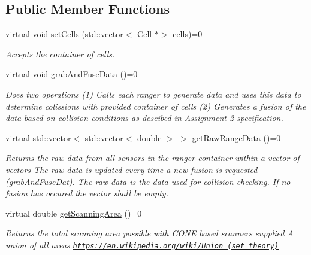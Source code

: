 \subsection*{Public Member Functions}
\begin{DoxyCompactItemize}
\item 
virtual void \hyperlink{classRangerFusionInterface_ab8fdee0050521767d33179a63da91e4f}{set\+Cells} (std\+::vector$<$ \hyperlink{classCell}{Cell} $\ast$$>$ cells)=0
\begin{DoxyCompactList}\small\item\em Accepts the container of cells. \end{DoxyCompactList}\item 
\mbox{\label{classRangerFusionInterface_ada6afdab2ce6d58a1bd0134f5e2be23f}} 
virtual void \hyperlink{classRangerFusionInterface_ada6afdab2ce6d58a1bd0134f5e2be23f}{grab\+And\+Fuse\+Data} ()=0
\begin{DoxyCompactList}\small\item\em Does two operations (1) Calls each ranger to generate data and uses this data to determine colissions with provided container of cells (2) Generates a \textquotesingle{}fusion\textquotesingle{} of the data based on collision conditions as descibed in Assignment 2 specification. \end{DoxyCompactList}\item 
virtual std\+::vector$<$ std\+::vector$<$ double $>$ $>$ \hyperlink{classRangerFusionInterface_a9d60ca5866261026b870d7c0171587f5}{get\+Raw\+Range\+Data} ()=0
\begin{DoxyCompactList}\small\item\em Returns the raw data from all sensors in the ranger container within a vector of vectors The raw data is updated every time a new fusion is requested (grab\+And\+Fuse\+Dat). The raw data is the data used for collision checking. If no fusion has occured the vector shall be empty. \end{DoxyCompactList}\item 
virtual double \hyperlink{classRangerFusionInterface_a65155605804376da4f67baf3c6f97f40}{get\+Scanning\+Area} ()=0
\begin{DoxyCompactList}\small\item\em Returns the total scanning area possible with C\+O\+NE based scanners supplied A union of all areas \href{https://en.wikipedia.org/wiki/Union_(set_theory)}{\tt https\+://en.\+wikipedia.\+org/wiki/\+Union\+\_\+(set\+\_\+theory)} \end{DoxyCompactList}\end{DoxyCompactItemize}


